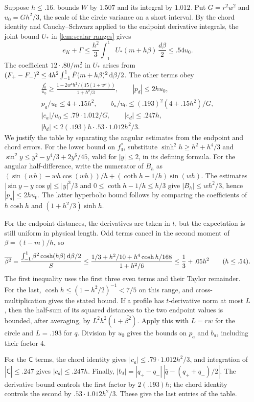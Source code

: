 Suppose $h\le.16$.  bounds $W$ by $1.507$ and its integral by $1.012$. Put $G=r^2w^2$ and $u_0=Gh^2/3$, the scale of the circle variance on a short interval. By the chord identity and Cauchy--Schwarz applied to the endpoint derivative integrals, the joint bound $U_*$ in \cref{lem:scalar-ranges} gives
\[
 e_K+\Gamma
 \le\frac{h^2}{3}\int_{-1}^1
 U_*(m+h\beta)\,\frac{d\beta}{2}
 \le .54u_0.
\]
The coefficient $12\cdot .80/m_*^2$ in $U_*$ arises from $(F_+-F_-)^2\le4h^2\int_{-1}^1\dot F(m+h\beta)^2\,\mathrm{d} \beta/2$. The other terms obey
\[
\begin{gathered}
 \frac{f_0^*}{u_0}\ge
   \frac{1-2w^4h^2/(15(1+w^2))}{1+h^2/3},
 \qquad |p_d|\le 2hu_0,\\
 p_a/u_0\le4+.15h^2,\qquad b_a/u_0\le(.193)^2(4+.15h^2)/G,\\
 |c_a|/u_0\le .79\cdot1.012/G,\qquad |c_d|\le .247h,\\
 |b_d|\le 2(.193)h\cdot .53\cdot1.012h^2/3.
\end{gathered}
\]
We justify the table by separating the angular estimates from the endpoint and chord errors. For the lower bound on $f_0^*$, substitute $\sinh^2h\ge h^2+h^4/3$ and $\sin^2 y\le y^2-y^4/3+2y^6/45$, valid for $|y|\le2$, in its defining formula. For the angular half-difference, write the numerator of $B_h$ as $(\sin(wh)-wh\cos(wh))/h+(\coth h-1/h)\sin(wh)$. The estimates $|\sin y-y\cos y|\le|y|^3/3$ and $0\le\coth h-1/h\le h/3$ give $|B_h|\le wh^2/3$, hence $|p_d|\le2hu_0$. The latter hyperbolic bound follows by comparing the coefficients of $h\cosh h$ and $(1+h^2/3)\sinh h$.

For the endpoint distances, the derivatives are taken in $t$, but the expectation is still uniform in physical length. Odd terms cancel in the second moment of $\beta=(t-m)/h$, so
\[
 \overline{\beta^2}
 =\frac{\int_{-1}^1\beta^2\cosh(h\beta)\,\mathrm{d} \beta/2}{S}
 \le\frac{1/3+h^2/10+h^4\cosh h/168}{1+h^2/6}
 \le\frac13+.05h^2\qquad(h\le.54).
\]
The first inequality uses the first three even terms and their Taylor remainder. For the last, $\cosh h\le(1-h^2/2)^{-1}<7/5$ on this range, and cross-multiplication gives the stated bound. If a profile has $t$-derivative norm at most $L$, then the half-sum of its squared distances to the two endpoint values is bounded, after averaging, by $L^2h^2(1+\overline{\beta^2})$. Apply this with $L=rw$ for the circle and $L=.193$ for $q$. Division by $u_0$ gives the bounds on $p_a$ and $b_a$, including their factor $4$.

For the $\mathsf C$ terms, the chord identity gives $|c_a|\le.79\cdot1.012h^2/3$, and integration of $|\dot{\mathsf C}|\le.247$ gives $|c_d|\le.247h$. Finally, $|b_d|=|q_+-q_-|\,|\bar q-(q_++q_-)/2|$. The derivative bound controls the first factor by $2(.193)h$; the chord identity controls the second by $.53\cdot1.012h^2/3$. These give the last entries of the table.

